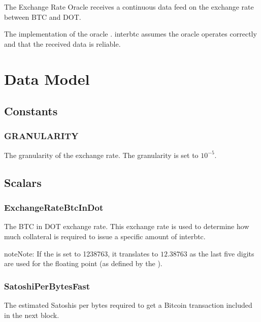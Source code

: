 \documentclass[a4paper,10pt,english]{sphinxmanual}
\begin{document}
The Exchange Rate Oracle receives a continuous data feed on the exchange rate between BTC and DOT.

The implementation of the oracle . interbtc assumes the oracle operates correctly and that the received data is reliable.


\section{Data Model}
\label{\detokenize{spec/oracle:data-model}}

\subsection{Constants}
\label{\detokenize{spec/oracle:constants}}

\subsubsection{GRANULARITY}
\label{\detokenize{spec/oracle:granularity}}
The granularity of the exchange rate. The granularity is set to \(10^{-5}\).


\subsection{Scalars}
\label{\detokenize{spec/oracle:scalars}}

\subsubsection{ExchangeRateBtcInDot}
\label{\detokenize{spec/oracle:exchangeratebtcindot}}
The BTC in DOT exchange rate. This exchange rate is used to determine how much collateral is required to issue a specific amount of interbtc.

\begin{sphinxadmonition}{note}{Note:}
If the  is set to 1238763, it translates to \(12.38763\) as the last five digits are used for the floating point (as defined by the ).
\end{sphinxadmonition}


\subsubsection{SatoshiPerBytesFast}
\label{\detokenize{spec/oracle:satoshiperbytesfast}}
The estimated Satoshis per bytes required to get a Bitcoin transaction included in the next block.
\end{document}
